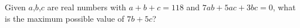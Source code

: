 Given $a$,$b$,$c$ are real numbers with $a+b+c=118$ and $7ab+5ac+3bc=0$, what is the maximum possible value of $7b+5c$?

